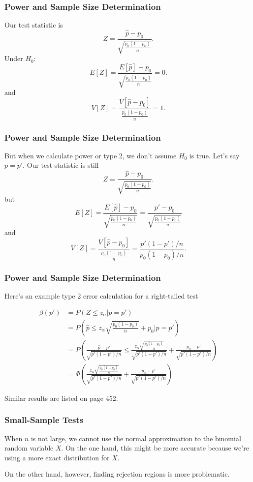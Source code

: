\documentclass{beamer}
\begin{document}
\begin{frame}
\frametitle{Power and Sample Size Determination}

Our test statistic is 
\[
Z = \frac{\hat{p} - p_0}{\sqrt{\frac{p_0(1-p_0)}{n}} }.
\]
Under $H_0$:
\[
E[Z] = \frac{ E[\hat{p}] - p_0}{\sqrt{\frac{p_0(1-p_0)}{n}} } = 0.
\]
and 
\[
V[Z] = \frac{V[\hat{p} - p_0 ]}{\frac{p_0(1-p_0)}{n} } = 1.
\]

\end{frame}

\begin{frame}
\frametitle{Power and Sample Size Determination}

But when we calculate power or type 2, we don't assume $H_0$ is true. Let's say $p=p'$. Our test statistic is still
\[
Z = \frac{\hat{p} - p_0}{\sqrt{\frac{p_0(1-p_0)}{n}} }.
\]
but
\[
E[Z] = \frac{E[\hat{p}] - p_0}{\sqrt{\frac{p_0(1-p_0)}{n}} } = \frac{p' - p_0}{\sqrt{\frac{p_0(1-p_0)}{n}} }
\]
and
\[
V[Z] = \frac{V[\hat{p} - p_0]}{\frac{p_0(1-p_0)}{n} } = \frac{p'(1-p')/n}{p_0(1-p_0)/n}.
\]
\end{frame}

\begin{frame}
\frametitle{Power and Sample Size Determination}

Here's an example type 2 error calculation for a right-tailed test

\begin{align*}
\beta(p') &= P(Z \le z_{\alpha} | p = p') \\
&= P(\hat{p} \le z_{\alpha}   \sqrt{\frac{p_0(1-p_0)}{n}} + p_0 | p = p') \\
&= P \left( \frac{\hat{p} - p'}{\sqrt{p'(1-p')/n }} \le \frac{ z_{\alpha}   \sqrt{\frac{p_0(1-p_0)}{n}} }{\sqrt{p'(1-p')/n }} + \frac{p_0 - p'}{\sqrt{p'(1-p')/n }} \right) \\
&= \Phi \left( \frac{ z_{\alpha}   \sqrt{\frac{p_0(1-p_0)}{n}} }{\sqrt{p'(1-p')/n }} + \frac{p_0 - p'}{\sqrt{p'(1-p')/n }}\right)
\end{align*}

Similar results are listed on page 452.
\end{frame}
\begin{frame}
\frametitle{Small-Sample Tests}

When $n$ is not large, we cannot use the normal approximation to the binomial random variable $X$. On the one hand, this might be more accurate because we're using a more exact distribution for $X$. 
\newline

On the other hand, however, finding rejection regions is more problematic. 

\end{frame}
\end{document}
